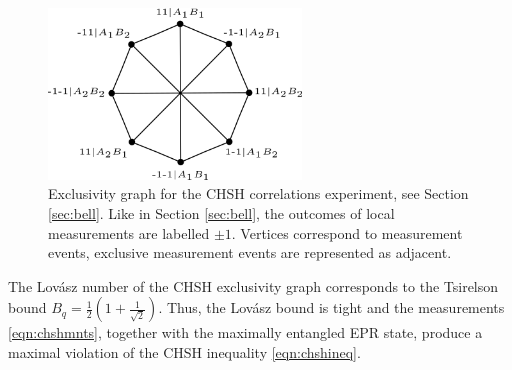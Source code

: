 \begin{figure}
    \centering
    \includegraphics[width=0.6\textwidth]{images/chshexcl.png}
    \caption{Exclusivity graph for the CHSH correlations experiment, see Section \ref{sec:bell}. Like in Section \ref{sec:bell}, the outcomes of local measurements are labelled $\pm 1$. Vertices correspond to measurement events, exclusive measurement events are represented as adjacent.}
    \label{fig:chshexcl}
\end{figure}

The Lovász number of the CHSH exclusivity graph corresponds to the Tsirelson bound $B_q = \frac{1}{2}(1+\frac{1}{\sqrt{2}})$. Thus, the Lovász bound is tight and the measurements \ref{eqn:chshmnts}, together with the maximally entangled EPR state, produce a maximal violation of the CHSH inequality \ref{eqn:chshineq}. 

